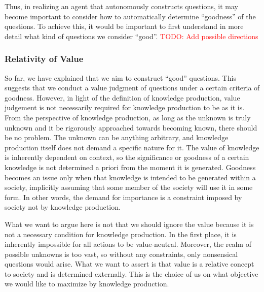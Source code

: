 \documentclass{book}
\begin{document}
Thus, in realizing an agent that autonomously constructs questions, it may become important to consider how to automatically determine ``goodness'' of the questions. To achieve this, it would be important to first understand in more detail what kind of questions we consider ``good''. \textcolor{red}{TODO: Add possible directions}


\subsubsection{Relativity of Value}

So far, we have explained that we aim to construct ``good'' questions. This suggests that we conduct a value judgment of questions under a certain criteria of goodness. However, in light of the definition of knowledge production, value judgement is not necessarily required for knowledge production to be as it is. From the perspective of knowledge production, as long as the unknown is truly unknown and it be rigorously approached towards becoming known, there should be no problem. The unknown can be anything arbitrary, and knowledge production itself does not demand a specific nature for it. The value of knowledge is inherently dependent on context, so the significance or goodness of a certain knowledge is not determined a priori from the moment it is generated. Goodness becomes an issue only when that knowledge is intended to be generated within a society, implicitly assuming that some member of the society will use it in some form. In other words, the demand for importance is a constraint imposed by society not by knowledge production.

What we want to argue here is not that we should ignore the value because it is not a necessary condition for knowledge production. In the first place, it is inherently impossible for all actions to be value-neutral. Moreover, the realm of possible unknowns is too vast, so without any constraints, only nonsensical questions would arise. What we want to assert is that value is a relative concept to society and is determined externally. This is the choice of us on what objective we would like to maximize by knowledge production.
\end{document}
